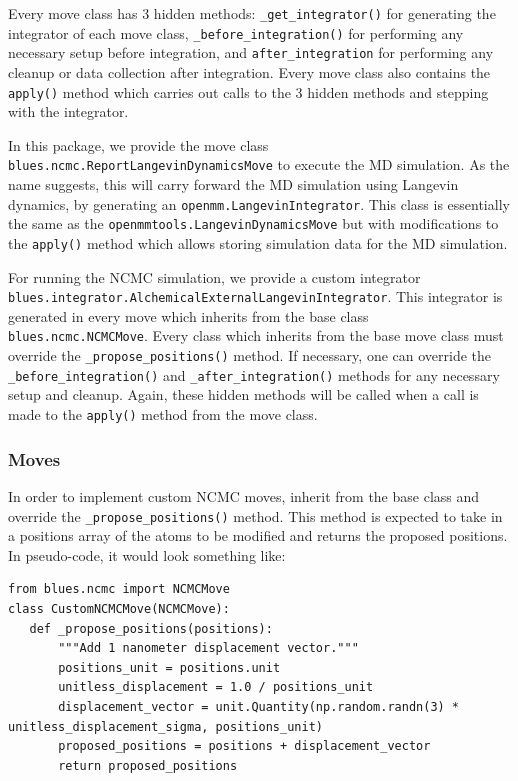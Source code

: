 Every move class has 3 hidden methods: \texttt{_get_integrator()} for generating the integrator of each move class, \texttt{_before_integration()} for performing any necessary setup before integration, and \texttt{after_integration} for performing any cleanup or data collection after integration. 
Every move class also contains the \texttt{apply()} method which carries out calls to the 3 hidden methods and stepping with the integrator.

In this package, we provide the move class \texttt{blues.ncmc.ReportLangevinDynamicsMove} to execute the MD simulation.
As the name suggests, this will carry forward the MD simulation using Langevin dynamics, by generating an \texttt{openmm.LangevinIntegrator}.
This class is essentially the same as the \texttt{openmmtools.LangevinDynamicsMove} but with modifications to the \texttt{apply()} method which allows storing simulation data for the MD simulation.

For running the NCMC simulation, we provide a custom integrator \texttt{blues.integrator.AlchemicalExternalLangevinIntegrator}. 
This integrator is generated in every move which inherits from the base class \texttt{blues.ncmc.NCMCMove}.
Every class which inherits from the base move class must override the \texttt{_propose_positions()} method.
If necessary, one can override the \texttt{_before_integration()} and \texttt{_after_integration()} methods for any necessary setup and cleanup.
Again, these hidden methods will be called when a call is made to the \texttt{apply()} method from the move class.

\subsubsection{Moves}
In order to implement custom NCMC moves, inherit from the base class and override the \texttt{_propose_positions()} method. 
This method is expected to take in a positions array of the atoms to be modified and returns the proposed positions.
In pseudo-code, it would look something like:

\begin{verbatim}
from blues.ncmc import NCMCMove
class CustomNCMCMove(NCMCMove):
   def _propose_positions(positions):
       """Add 1 nanometer displacement vector."""
       positions_unit = positions.unit
       unitless_displacement = 1.0 / positions_unit
       displacement_vector = unit.Quantity(np.random.randn(3) * unitless_displacement_sigma, positions_unit)
       proposed_positions = positions + displacement_vector
       return proposed_positions
\end{verbatim}

